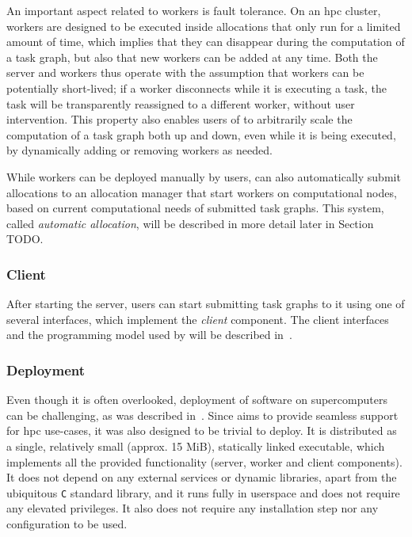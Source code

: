 An important aspect related to workers is fault tolerance. On an \gls{hpc} cluster,
\hyperqueue{} workers are designed to be executed inside allocations that only run for a
limited amount of time, which implies that they can disappear during the computation of a task
graph, but also that new workers can be added at any time. Both the server and workers thus operate
with the assumption that workers can be potentially short-lived; if a worker disconnects while it
is executing a task, the task will be transparently reassigned to a different worker, without user
intervention. This property also enables users of \hyperqueue{} to arbitrarily scale the
computation of a task graph both up and down, even while it is being executed, by dynamically
adding or removing workers as needed.

While workers can be deployed manually by users, \hyperqueue{} can also automatically
submit allocations to an allocation manager that start workers on computational nodes, based on
current computational needs of submitted task graphs. This system, called \emph{automatic allocation},
will be described in more detail later in Section TODO.

\subsubsection*{Client}
After starting the server, users can start submitting task graphs to it using one of several
interfaces, which implement the \emph{client} component. The client interfaces and the
programming model used by \hyperqueue{} will be described in~\cite{hq:programming-model}.

\subsubsection*{Deployment}
Even though it is often overlooked, deployment of software on supercomputers can be challenging, as
was described in~. Since \hyperqueue{} aims to provide seamless
support for \gls{hpc} use-cases, it was also designed to be trivial to deploy. It is
distributed as a single, relatively small (approx. 15 MiB), statically linked executable, which
implements all the provided functionality (server, worker and client components). It does not
depend on any external services or dynamic libraries, apart from the ubiquitous
\texttt{C} standard library, and it runs fully in userspace and does not require any
elevated privileges. It also does not require any installation step nor any configuration to be
used.

